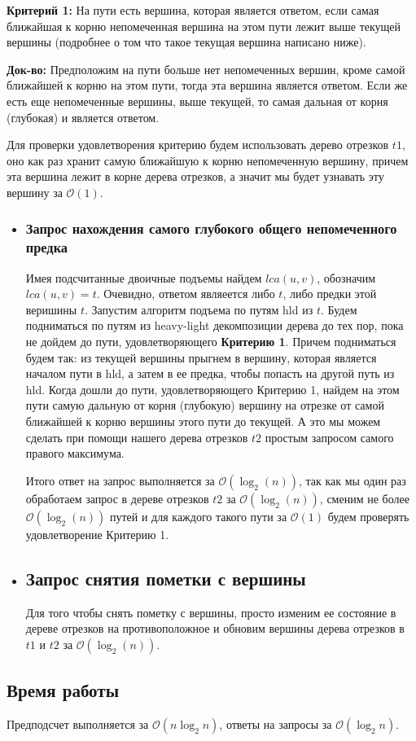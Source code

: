\documentclass{article}
\begin{document}
\qquad
\textbf{Критерий 1:} На пути есть вершина, которая является ответом, если самая ближайшая к корню непомеченная вершина на этом пути лежит выше текущей вершины (подробнее о том что такое текущая вершина написано ниже).

\qquad
\textbf{Док-во:} Предположим на пути больше нет непомеченных вершин, кроме самой ближайшей к корню на этом пути, тогда эта вершина является ответом. Если же есть еще непомеченные вершины, выше текущей, то самая дальная от корня (глубокая) и является ответом.

\quad 
Для проверки удовлетворения критерию будем использовать дерево отрезков $t1$, оно как раз хранит самую ближайшую к корню непомеченную вершину, причем эта вершина лежит в корне дерева отрезков, а значит мы будет узнавать эту вершину за $\mathcal{O}(1)$.
\begin{itemize}
	\item[\RomanNumeralCaps{1}]
	\subsubsection*{Запрос нахождения самого глубокого общего непомеченного предка} 
	
	\quad
	Имея подсчитанные двоичные подъемы найдем $lca(u, v)$, обозначим $lca(u, v) = t$. Очевидно, ответом являеется либо $t$, либо предки этой веришины $t$. Запустим алгоритм подъема по путям hld из $t$. Будем подниматься по путям из heavy-light декомпозиции дерева до тех пор, пока не дойдем до пути, удовлетворяющего \textbf{Критерию 1}. Причем подниматься будем так: из текущей вершины прыгнем в вершину, которая является началом пути в hld, а затем в ее предка, чтобы попасть на другой путь из hld. Когда дошли до пути, удовлетворяющего Критерию 1, найдем на этом пути самую дальную от корня (глубокую) вершину на отрезке от самой ближайшей к корню вершины этого пути до текущей. А это мы можем сделать при помощи нашего дерева отрезков $t2$ простым запросом самого правого максимума. 
	
	\qquad
	Итого ответ на запрос выполняется за $\mathcal{O}(\log_2(n))$, так как мы один раз обработаем запрос в дереве отрезков $t2$ за $\mathcal{O}(\log_2(n))$, сменим не более $\mathcal{O}(\log_2(n))$ путей и для каждого такого пути за $\mathcal{O}(1)$ будем проверять удовлетворение Критерию 1.
	\item[\RomanNumeralCaps{2}]
	\subsection*{Запрос снятия пометки с вершины}
	Для того чтобы снять пометку с вершины, просто изменим ее состояние в дереве отрезков на противоположное и обновим вершины дерева отрезков в $t1$ и $t2$ за $\mathcal{O}(\log_2(n))$.
	
	
\end{itemize}

\subsection*{Время работы}
Предподсчет выполняется за $\mathcal{O}(n\log_2{n})$, ответы на запросы за $\mathcal{O}(\log_2{n})$.
\end{document}
